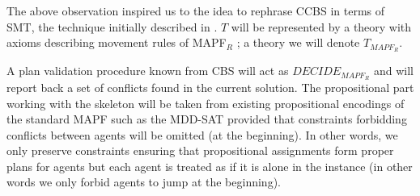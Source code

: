 
The above observation  inspired us to the idea to rephrase CCBS in terms of SMT, the technique initially described in \cite{DBLP:conf/socs/Surynek19}. $T$ will be represented by a theory with axioms describing movement rules of MAPF$_R$ ; a theory we will denote $T_{\mathit{MAPF}_R}$.

A plan validation procedure   known from CBS will act as $\mathit{DECIDE}_{\mathit{MAPF}_R}$ and will report back a set of conflicts found in the current solution. The propositional part working with the skeleton will be taken from existing propositional encodings of the standard MAPF such as the MDD-SAT \cite{DBLP:conf/ecai/SurynekFSB16} provided that constraints forbidding conflicts between agents will be omitted (at the beginning). In other words, we only preserve constraints ensuring that propositional assignments form proper plans for agents but each agent is treated as if it is alone in the instance (in other words we only forbid agents to jump at the beginning).


